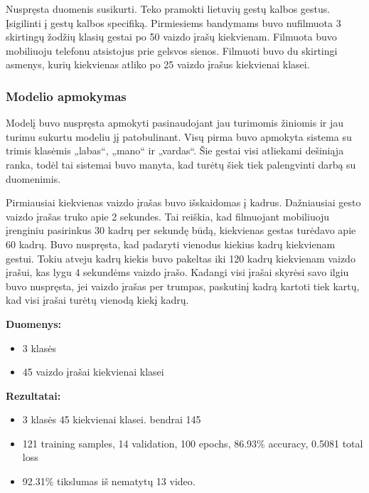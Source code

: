 \documentclass{VUMIFPSbakalaurinis}
\begin{document}
Nuspręsta duomenis susikurti. Teko pramokti lietuvių gestų kalbos gestus. Įsigilinti į gestų kalbos specifiką. Pirmiesiems bandymams buvo nufilmuota 3 skirtingų žodžių klasių gestai po 50 vaizdo įrašų kiekvienam. Filmuota buvo mobiliuoju telefonu atsistojus prie gelsvos sienos. Filmuoti buvo du skirtingi asmenys, kurių kiekvienas atliko po 25 vaizdo įrašus kiekvienai klasei.

\subsubsection{Modelio apmokymas}

Modelį buvo nuspręsta apmokyti pasinaudojant jau turimomis žiniomis ir jau turimu sukurtu modeliu jį patobulinant. Visų pirma buvo apmokyta sistema su trimis klasėmis „labas“, „mano“ ir „vardas“. Šie gestai visi atliekami dešiniąja ranka, todėl tai sistemai buvo manyta, kad turėtų šiek tiek palengvinti darbą su duomenimis.

Pirmiausiai kiekvienas vaizdo įrašas buvo išskaidomas į kadrus. Dažniausiai gesto vaizdo įrašas truko apie 2 sekundes. Tai reiškia, kad filmuojant mobiliuoju įrenginiu pasirinkus 30 kadrų per sekundę būdą, kiekvienas gestas turėdavo apie 60 kadrų. Buvo nuspręsta, kad padaryti vienodus kiekius kadrų kiekvienam gestui. Tokiu atveju kadrų kiekis buvo pakeltas iki 120 kadrų kiekvienam vaizdo įrašui, kas lygu 4 sekundėms vaizdo įrašo. Kadangi visi įrašai skyrėsi savo ilgiu buvo nuspręsta, jei vaizdo įrašas per trumpas, paskutinį kadrą kartoti tiek kartų, kad visi įrašai turėtų vienodą kiekį kadrų. 


\textbf{Duomenys:}
\begin{itemize}
	\item 3 klasės
	\item 45 vaizdo įrašai kiekvienai klasei
\end{itemize}

\textbf{Rezultatai:}


\begin{itemize}
	\item 3 klasės 45 kiekvienai klasei. bendrai 145
	\item 121 training samples, 14 validation, 100 epochs, 86.93\% accuracy, 0.5081 total loss
	\item 92.31\% tikslumas iš nematytų 13 video.
\end{itemize}

\end{document}
